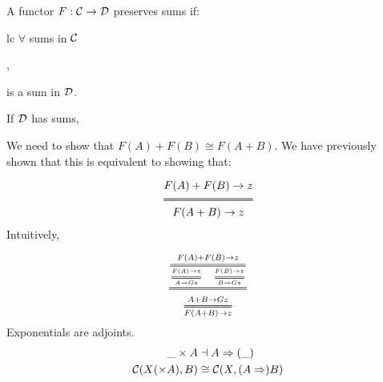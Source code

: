 \begin{example}
A functor $F: \mathcal{C} \to \mathcal{D}$ preserves sums if:

  \begin{center}
    \begin{tabular}[t]{lc}
    $\forall$ sums in $\mathcal{C}$
    ,
    is a sum in $\mathcal{D}$.
    \end{tabular}
  \end{center}

If $\mathcal{D}$ has sums, 

\begin{center}
\end{center} 

We need to show that $F(A) + F(B) \cong F(A + B)$. We have previously shown
that this is equivalent to showing that: 

\[ 
  \Efrac
    {F(A) + F(B) \to z}
    {F(A + B) \to z}
\]

Intuitively,

\LARGE\[
  \Efrac
  {
  \Efrac
    {F(A) + F(B) \to z} 
    { \Efrac 
      {F(A) \to z}  
      {A \to G z}
      \quad 
      \Efrac 
      {F(B) \to z}
      {B \to G z}
    }
  }
  {
    \Efrac 
    {A + B \to G z}
    {F(A + B) \to z}
  }
\]

\end{example}

\begin{example}
  Exponentials are adjoints.
  \begin{align*}
    \_ \times A &\dashv A \Rightarrow (\_) \\
    \mathcal{C}(X (\times A), B) &\cong \mathcal{C}(X, (A \Rightarrow) B)
  \end{align*}
\end{example} 
